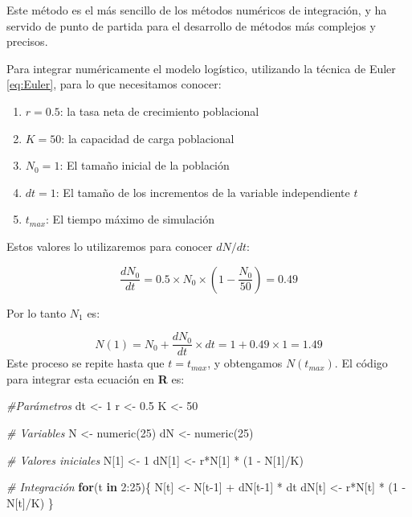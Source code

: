 \documentclass[
]{book}
\newenvironment{Shaded}{\begin{snugshade}}{\end{snugshade}}
\newcommand{\CommentTok}[1]{\textcolor[rgb]{0.56,0.35,0.01}{\textit{#1}}}
\newcommand{\ControlFlowTok}[1]{\textcolor[rgb]{0.13,0.29,0.53}{\textbf{#1}}}
\newcommand{\DecValTok}[1]{\textcolor[rgb]{0.00,0.00,0.81}{#1}}
\newcommand{\FloatTok}[1]{\textcolor[rgb]{0.00,0.00,0.81}{#1}}
\newcommand{\FunctionTok}[1]{\textcolor[rgb]{0.00,0.00,0.00}{#1}}
\newcommand{\NormalTok}[1]{#1}
\newcommand{\OtherTok}[1]{\textcolor[rgb]{0.56,0.35,0.01}{#1}}
\newcommand{\SpecialCharTok}[1]{\textcolor[rgb]{0.00,0.00,0.00}{#1}}
\providecommand{\tightlist}{%
  \setlength{\itemsep}{0pt}\setlength{\parskip}{0pt}}
\begin{document}
Este método es el más sencillo de los métodos numéricos de integración, y ha servido de punto de partida para el desarrollo de métodos más complejos y precisos.

Para integrar numéricamente el modelo logístico, utilizando la técnica de Euler \eqref{eq:Euler}, para lo que necesitamos conocer:

\begin{enumerate}
\def\labelenumi{\arabic{enumi}.}
\tightlist
\item
  \(r = 0.5\): la tasa neta de crecimiento poblacional
\item
  \(K = 50\): la capacidad de carga poblacional
\item
  \(N_0 = 1\): El tamaño inicial de la población
\item
  \(dt = 1\): El tamaño de los incrementos de la variable independiente \(t\)
\item
  \(t_{max}\): El tiempo máximo de simulación
\end{enumerate}

Estos valores lo utilizaremos para conocer \(dN/dt\):

\[\frac{dN_0}{dt} = 0.5 \times N_0 \times \left (1 - \frac{N_0}{50} \right)=0.49\]

Por lo tanto \(N_1\) es:

\[N(1) = N_0 + \frac{dN_0}{dt} \times dt = 1 + 0.49 \times 1 = 1.49\]
Este proceso se repite hasta que \(t = t_{max}\), y obtengamos \(N(t_{max})\). El código para integrar esta ecuación en \textbf{R} es:

\begin{Shaded}
\begin{Highlighting}[]
\CommentTok{\#Parámetros}
\NormalTok{dt }\OtherTok{\textless{}{-}} \DecValTok{1}
\NormalTok{r }\OtherTok{\textless{}{-}} \FloatTok{0.5}
\NormalTok{K }\OtherTok{\textless{}{-}} \DecValTok{50}

\CommentTok{\# Variables}
\NormalTok{N }\OtherTok{\textless{}{-}} \FunctionTok{numeric}\NormalTok{(}\DecValTok{25}\NormalTok{)}
\NormalTok{dN }\OtherTok{\textless{}{-}} \FunctionTok{numeric}\NormalTok{(}\DecValTok{25}\NormalTok{)}

\CommentTok{\# Valores iniciales}
\NormalTok{N[}\DecValTok{1}\NormalTok{] }\OtherTok{\textless{}{-}} \DecValTok{1}
\NormalTok{dN[}\DecValTok{1}\NormalTok{] }\OtherTok{\textless{}{-}}\NormalTok{ r}\SpecialCharTok{*}\NormalTok{N[}\DecValTok{1}\NormalTok{] }\SpecialCharTok{*}\NormalTok{ (}\DecValTok{1} \SpecialCharTok{{-}}\NormalTok{ N[}\DecValTok{1}\NormalTok{]}\SpecialCharTok{/}\NormalTok{K)}

\CommentTok{\# Integración}
\ControlFlowTok{for}\NormalTok{(t }\ControlFlowTok{in} \DecValTok{2}\SpecialCharTok{:}\DecValTok{25}\NormalTok{)\{}
\NormalTok{    N[t] }\OtherTok{\textless{}{-}}\NormalTok{ N[t}\DecValTok{{-}1}\NormalTok{] }\SpecialCharTok{+}\NormalTok{ dN[t}\DecValTok{{-}1}\NormalTok{] }\SpecialCharTok{*}\NormalTok{ dt}
\NormalTok{    dN[t] }\OtherTok{\textless{}{-}}\NormalTok{ r}\SpecialCharTok{*}\NormalTok{N[t] }\SpecialCharTok{*}\NormalTok{ (}\DecValTok{1} \SpecialCharTok{{-}}\NormalTok{ N[t]}\SpecialCharTok{/}\NormalTok{K)}
\NormalTok{\}}
\end{Highlighting}
\end{Shaded}
\end{document}

